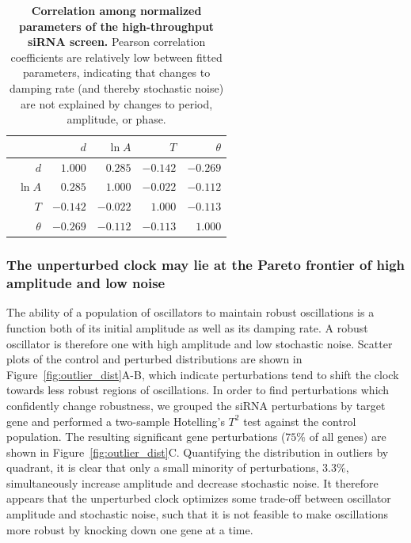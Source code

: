 \documentclass[11pt, letterpaper]{article}
\begin{document}
\begin{table}
  \begin{center}
    \begin{tabular}{rrrrr}
      \toprule
      {}       & $d$    & $\ln A$ & $T$    & $\theta$ \\\midrule
      $d$      & $1.000 $ & $0.285 $  & $-0.142$ & $-0.269$\\\
      $\ln A$  & $0.285 $ & $1.000 $  & $-0.022$ & $-0.112$\\
      $T$      & $-0.142$ & $-0.022$  & $1.000 $ & $-0.113$\\
      $\theta$ & $-0.269$ & $-0.112$  & $-0.113$ & $1.000 $\\
      \bottomrule
    \end{tabular}
  \end{center}
  \caption{{\bfseries Correlation among normalized parameters of the high-throughput siRNA screen.} Pearson correlation coefficients are relatively low between fitted parameters, indicating that changes to damping rate (and thereby stochastic noise) are not explained by changes to period, amplitude, or phase.}
  \label{tab:corr}
\end{table}


\subsubsection*{The unperturbed clock may lie at the Pareto frontier of high amplitude and low noise}

The ability of a population of oscillators to maintain robust oscillations is a function both of its initial amplitude as well as its damping rate.
A robust oscillator is therefore one with high amplitude and low stochastic noise.
Scatter plots of the control and perturbed distributions are shown in Figure~\ref{fig:outlier_dist}A-B, which indicate perturbations tend to shift the clock towards less robust regions of oscillations.
In order to find perturbations which confidently change robustness, we grouped the siRNA perturbations by target gene and performed a two-sample Hotelling's $T^2$ test against the control population.
The resulting significant gene perturbations ($75\%$ of all genes) are shown in Figure~\ref{fig:outlier_dist}C.
Quantifying the distribution in outliers by quadrant, it is clear that only a small minority of perturbations, $3.3\%$, simultaneously increase amplitude and decrease stochastic noise.
It therefore appears that the unperturbed clock optimizes some trade-off between oscillator amplitude and stochastic noise, such that it is not feasible to make oscillations more robust by knocking down one gene at a time.
\end{document}
